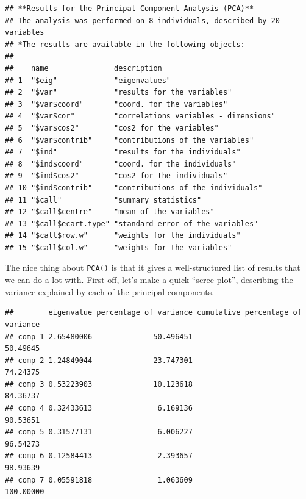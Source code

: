 \documentclass[
]{book}
\newenvironment{Shaded}{\begin{snugshade}}{\end{snugshade}}
\newcommand{\CommentTok}[1]{\textcolor[rgb]{0.56,0.35,0.01}{\textit{#1}}}
\newcommand{\NormalTok}[1]{#1}
\newcommand{\SpecialCharTok}[1]{\textcolor[rgb]{0.81,0.36,0.00}{\textbf{#1}}}
\begin{document}
\begin{verbatim}
## **Results for the Principal Component Analysis (PCA)**
## The analysis was performed on 8 individuals, described by 20 variables
## *The results are available in the following objects:
## 
##    name               description                          
## 1  "$eig"             "eigenvalues"                        
## 2  "$var"             "results for the variables"          
## 3  "$var$coord"       "coord. for the variables"           
## 4  "$var$cor"         "correlations variables - dimensions"
## 5  "$var$cos2"        "cos2 for the variables"             
## 6  "$var$contrib"     "contributions of the variables"     
## 7  "$ind"             "results for the individuals"        
## 8  "$ind$coord"       "coord. for the individuals"         
## 9  "$ind$cos2"        "cos2 for the individuals"           
## 10 "$ind$contrib"     "contributions of the individuals"   
## 11 "$call"            "summary statistics"                 
## 12 "$call$centre"     "mean of the variables"              
## 13 "$call$ecart.type" "standard error of the variables"    
## 14 "$call$row.w"      "weights for the individuals"        
## 15 "$call$col.w"      "weights for the variables"
\end{verbatim}

The nice thing about \texttt{PCA()} is that it gives a well-structured list of results that we can do a lot with. First off, let's make a quick ``scree plot'', describing the variance explained by each of the principal components.

\begin{Shaded}
\end{Shaded}

\begin{verbatim}
##        eigenvalue percentage of variance cumulative percentage of variance
## comp 1 2.65480006              50.496451                          50.49645
## comp 2 1.24849044              23.747301                          74.24375
## comp 3 0.53223903              10.123618                          84.36737
## comp 4 0.32433613               6.169136                          90.53651
## comp 5 0.31577131               6.006227                          96.54273
## comp 6 0.12584413               2.393657                          98.93639
## comp 7 0.05591818               1.063609                         100.00000
\end{verbatim}
\end{document}
